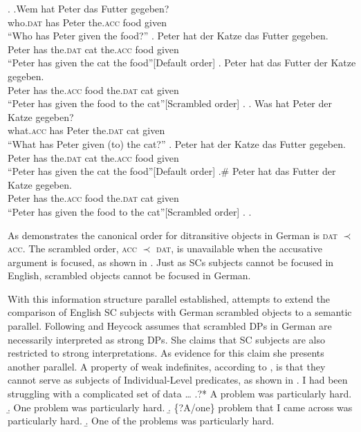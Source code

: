\documentclass[GPFinal]{subfiles}
\begin{document}
\ex.
\ag.Wem hat Peter das Futter gegeben?\\
who.\textsc{dat} has Peter the.\textsc{acc} food given\\
``Who has Peter given the food?''
\ag. Peter hat der Katze das Futter gegeben.\\
Peter has the.\textsc{dat} cat the.\textsc{acc} food given\\
``Peter has given the cat the food''\hfill[Default order]
\bg. Peter hat das Futter der Katze gegeben.\\
Peter has the.\textsc{acc} food the.\textsc{dat} cat given\\
``Peter has given the food to the cat''\hfill[Scrambled order]
\z.
\bg. Was hat Peter der Katze gegeben?\\
what.\textsc{acc} has Peter the.\textsc{dat} cat given\\
``What has Peter given (to) the cat?''
\ag. Peter hat der Katze das Futter gegeben.\\
Peter has the.\textsc{dat} cat the.\textsc{acc} food given\\
``Peter has given the cat the food''\hfill[Default order]
\bg.\# Peter hat das Futter der Katze gegeben.\\
Peter has the.\textsc{acc} food the.\textsc{dat} cat given\\
``Peter has given the food to the cat''\hfill[Scrambled order]
\z.
\z.

As \Last demonstrates the canonical order for ditransitive objects in German is \textsc{dat} $\prec$ \textsc{acc}.
The scrambled order, \textsc{acc} $\prec$ \textsc{dat}, is unavailable when the accusative argument is focused, as shown in \Last[b-ii]. 
Just as SCs subjects cannot be focused in English, scrambled objects cannot be focused in German.

With this information structure parallel established, \textcite{heycock2012specification} attempts to extend the comparison of English SC subjects with German scrambled objects to a semantic parallel.
Following \textcite{dehoop1992case} and \textcite{diesing1992indefinites} Heycock assumes that scrambled DPs in German are necessarily interpreted as strong DPs.
She claims that SC subjects are also restricted to strong interpretations.
As evidence for this claim she presents another parallel.
A property of weak indefinites, according to \textcite{milsark1974existential}, is that they cannot serve as subjects of Individual-Level predicates, as shown in \Next
\ex. I had been struggling with a complicated set of data \ldots
\a.?* A problem was particularly hard.
\b. One problem was particularly hard.
\b. \{?A/one\} problem that I came across was particularly hard.
\b. One of the problems was particularly hard.\hfill\parencite{heycock2012specification}
\end{document}
